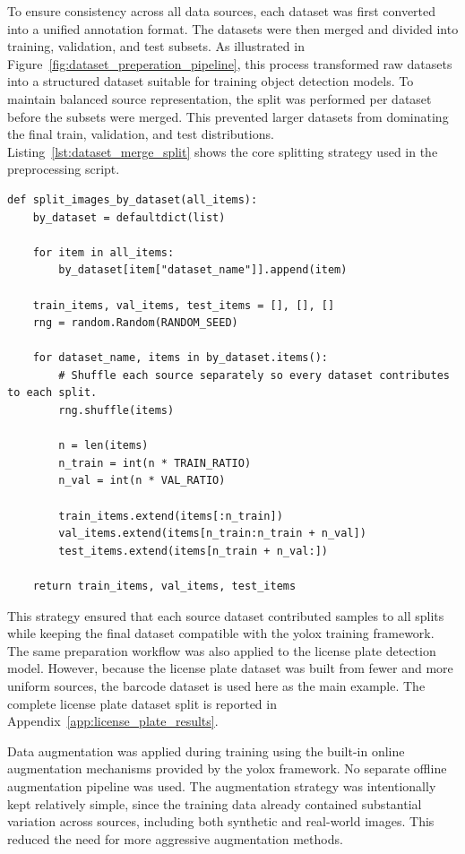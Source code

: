 To ensure consistency across all data sources, each dataset was first converted into a unified annotation format. The datasets were then merged and divided into training, validation, and test subsets. As illustrated in Figure~\ref{fig:dataset_preperation_pipeline}, this process transformed raw datasets into a structured dataset suitable for training \gls{object detection} models. To maintain balanced source representation, the split was performed per dataset before the subsets were merged. This prevented larger datasets from dominating the final train, validation, and test distributions. Listing~\ref{lst:dataset_merge_split} shows the core splitting strategy used in the preprocessing script.

\begin{lstlisting}[caption={Per-dataset splitting strategy used during dataset merging}, label={lst:dataset_merge_split}]
def split_images_by_dataset(all_items):
    by_dataset = defaultdict(list)

    for item in all_items:
        by_dataset[item["dataset_name"]].append(item)

    train_items, val_items, test_items = [], [], []
    rng = random.Random(RANDOM_SEED)

    for dataset_name, items in by_dataset.items():
        # Shuffle each source separately so every dataset contributes to each split.
        rng.shuffle(items)

        n = len(items)
        n_train = int(n * TRAIN_RATIO)
        n_val = int(n * VAL_RATIO)

        train_items.extend(items[:n_train])
        val_items.extend(items[n_train:n_train + n_val])
        test_items.extend(items[n_train + n_val:])

    return train_items, val_items, test_items
\end{lstlisting}

This strategy ensured that each source dataset contributed samples to all splits while keeping the final dataset compatible with the \gls{yolox} training framework. The same preparation workflow was also applied to the license plate detection model. However, because the license plate dataset was built from fewer and more uniform sources, the \gls{barcode} dataset is used here as the main example. The complete license plate dataset split is reported in Appendix~\ref{app:license_plate_results}.


Data augmentation was applied during training using the built-in online augmentation mechanisms provided by the \gls{yolox} framework. No separate offline augmentation pipeline was used. The augmentation strategy was intentionally kept relatively simple, since the training data already contained substantial variation across sources, including both synthetic and real-world images. This reduced the need for more aggressive augmentation methods.

